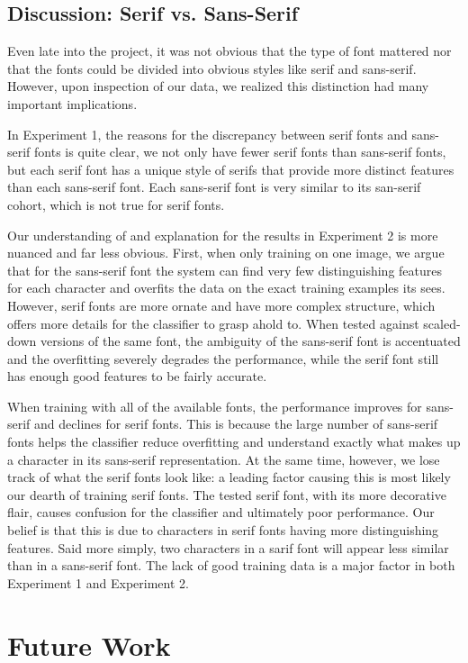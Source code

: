 \documentclass[10pt,twocolumn,letterpaper]{article}
\begin{document}
\subsection{Discussion: Serif vs. Sans-Serif}
Even late into the project, it was not obvious that the type of font mattered nor that the fonts could be divided into obvious styles like serif and sans-serif. However, upon inspection of our data, we realized this distinction had many important implications.

In Experiment 1, the reasons for the discrepancy between serif fonts and sans-serif fonts is quite clear, we not only have fewer serif fonts than sans-serif fonts, but each serif font has a unique style of serifs that provide more distinct features than each sans-serif font. Each sans-serif font is very similar to its san-serif cohort, which is not true for serif fonts.

Our understanding of and explanation for the results in Experiment 2 is more nuanced and far less obvious. First, when only training on one image, we argue that for the sans-serif font the system can find very few distinguishing features for each character and overfits the data on the exact training examples its sees. However, serif fonts are more ornate and have more complex structure, which offers more details for the classifier to grasp ahold to. When tested against scaled-down versions of the same font, the ambiguity of the sans-serif font is accentuated and the overfitting severely degrades the performance, while the serif font still has enough good features to be fairly accurate.

When training with all of the available fonts, the performance improves for sans-serif and declines for serif fonts. This is because the large number of sans-serif fonts helps the classifier reduce overfitting and understand exactly what makes up a character in its sans-serif representation. At the same time, however, we lose track of what the serif fonts look like: a leading factor causing this is most likely our dearth of training serif fonts. The tested serif font, with its more decorative flair, causes confusion for the classifier and ultimately poor performance. Our belief is that this is due to characters in serif fonts having more distinguishing features. Said more simply, two characters in a sarif font will appear less similar than in a sans-serif font. The lack of good training data is a major factor in both Experiment 1 and Experiment 2.

\section{Future Work}
\end{document}
